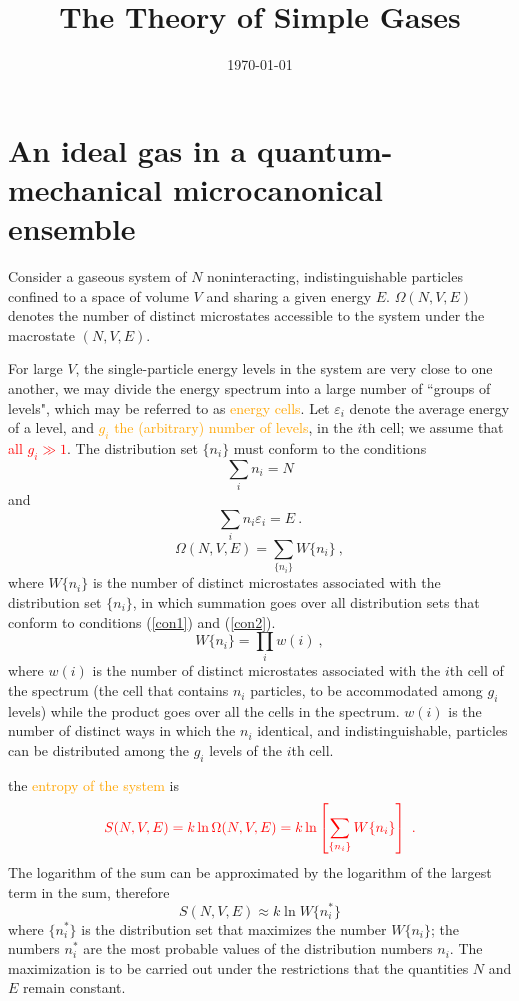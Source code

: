 \documentclass[12pt,a4paper]{article}
\title{The Theory of Simple Gases}
\author{}
\date{\today}
\begin{document}
\maketitle



\section{An ideal gas in a quantum-mechanical microcanonical ensemble}
Consider a gaseous system of $N$ noninteracting, indistinguishable particles confined to a space of volume $V$ and sharing a given energy $E$. $\Omega(N, V, E)$ denotes the number of distinct microstates accessible to the system under the macrostate $(N,V,E)$.

For large $V$, the single-particle energy levels in the system are very close to one another, we may divide the energy spectrum into a large number of ``groups of levels", which may be referred to as \textcolor{orange}{energy cells}. Let $\varepsilon_i$ denote the average energy of a level, and \textcolor{orange}{$g_i$ the (arbitrary) number of levels}, in the $i$th cell; we assume that \textcolor{red}{all $g_i \gg 1$}. The distribution set $\{n_i\}$ must conform to the conditions
\begin{equation}
\sum_i n_i = N 
\label{con1}
\end{equation}
and 
\begin{equation}
\sum_i n_i \varepsilon_i = E ~.
\label{con2}
\end{equation}
\begin{equation}
\Omega(N, V, E) = \sum_{\{n_i\}} W\{n_i\} ~,
\end{equation}
where $W\{n_i\}$ is the number of distinct microstates associated with the distribution set $\{n_i\}$, in which summation goes over all distribution sets that conform to conditions (\ref{con1}) and (\ref{con2}).
\begin{equation}
W\{n_i\} = \prod_i w(i) ~,
\end{equation}
where $w(i)$ is the number of distinct microstates associated with the $i$th cell of the spectrum (the cell that contains $n_i$ particles, to be accommodated among $g_i$ levels) while the product goes over all the cells in the spectrum. $w(i)$ is the number of distinct ways in which the $n_i$ identical, and indistinguishable, particles can be distributed among the $g_i$ levels of the $i$th cell. 


the \textcolor{orange}{entropy of the system} is
\begin{equation}
\color{red} S(N, V, E) = k\ln \Omega(N, V, E) = k \ln \left[\sum_{\{n_i\}} W\{n_i\} \right] ~.
\end{equation}
The logarithm of the sum can be approximated by the logarithm of the largest term in the sum, therefore
\begin{equation}
S(N, V, E) \approx k\ln W\{n_i^\ast \}
\end{equation}
where $\{n_i^\ast \}$ is the distribution set that maximizes the number $W\{n_i\}$; the numbers $n_i^\ast$ are the most probable values of the distribution numbers $n_i$. The maximization is to be carried out under the restrictions that the quantities $N$ and $E$ remain constant.
\end{document}
